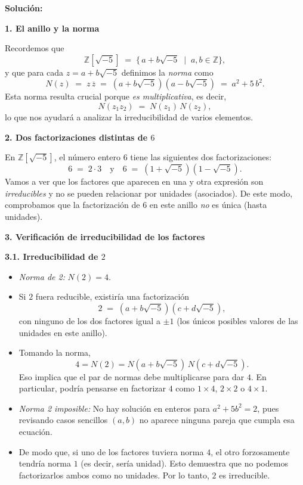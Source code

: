 \noindent
\textbf{Solución:}

\medskip

\noindent
\textbf{1. El anillo y la norma}

\noindent
Recordemos que
\[
\mathbb{Z}[\sqrt{-5}] \;=\; \{\, a + b\sqrt{-5} \;\mid\; a,b\in\mathbb{Z}\},
\]
y que para cada \(z = a + b\sqrt{-5}\) definimos la \emph{norma} como
\[
N(z) \;=\; z \, \overline{z} 
\;=\; (a + b\sqrt{-5})(a - b\sqrt{-5})
\;=\; a^2 + 5\,b^2.
\]
Esta norma resulta crucial porque \emph{es multiplicativa}, es decir, 
\[
N(z_1 z_2) \;=\; N(z_1)\,N(z_2),
\]
lo que nos ayudará a analizar la irreducibilidad de varios elementos.

\bigskip

\noindent
\textbf{2. Dos factorizaciones distintas de \(6\)}

\noindent
En \(\mathbb{Z}[\sqrt{-5}]\), el número entero \(6\) tiene las siguientes dos factorizaciones:
\[
6 \;=\; 2 \cdot 3
\quad\text{y}\quad
6 \;=\; (1 + \sqrt{-5})(1 - \sqrt{-5}).
\]
Vamos a ver que los factores que aparecen en una y otra expresión son \emph{irreducibles} y no se pueden relacionar por unidades (asociados). De este modo, comprobamos que la factorización de \(6\) en este anillo \emph{no} es única (hasta unidades).

\bigskip

\noindent
\textbf{3. Verificación de irreducibilidad de los factores}

\medskip

\noindent
\textbf{3.1. Irreducibilidad de \(2\)}

\begin{itemize}
    \item \emph{Norma de 2:} \(N(2) = 4\).
    \item Si \(2\) fuera reducible, existiría una factorización 
    \[
    2 \;=\; (a + b\sqrt{-5})(c + d\sqrt{-5}),
    \]
    con ninguno de los dos factores igual a \(\pm 1\) (los únicos posibles valores de las unidades en este anillo).  
    \item Tomando la norma, 
    \[
    4 = N(2) = N(a + b\sqrt{-5})\, N(c + d\sqrt{-5}).
    \]
    Eso implica que el par de normas debe multiplicarse para dar \(4\). En particular, podría pensarse en factorizar \(4\) como \(1 \times 4\), \(2 \times 2\) o \(4 \times 1\).
    \item \emph{Norma 2 imposible:} No hay solución en enteros para \(a^2 + 5 b^2 = 2\), pues revisando casos sencillos \((a,b)\) no aparece ninguna pareja que cumpla esa ecuación.  
    \item De modo que, si uno de los factores tuviera norma \(4\), el otro forzosamente tendría norma \(1\) (es decir, sería unidad). Esto demuestra que no podemos factorizarlos ambos como no unidades. Por lo tanto, \(2\) es irreducible.
\end{itemize}

